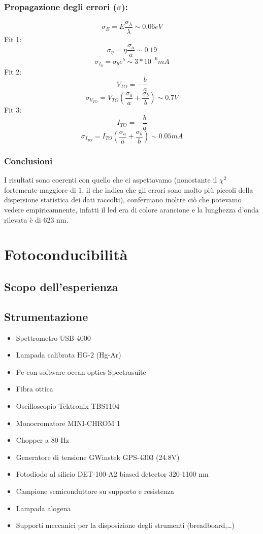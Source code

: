 \documentclass{article}
\begin{document}
\subsubsection{Propagazione degli errori ($\sigma$): }

$$\sigma_E=E\frac{\sigma_{\lambda}}{\lambda} \sim 0.06 eV$$
Fit 1:
$$\sigma_{\eta}=\eta\frac{\sigma_a}{a}\sim 0.19$$
$$\sigma_{I_0}=\sigma_be^b \sim 3*10^{-6} mA$$
Fit 2:
$$V_{TO}=-\frac{b}{a}$$
$$\sigma_{V_{TO}}=V_{TO}\left(\frac{\sigma_a}{a}+\frac{\sigma_b}{b}\right)\sim0.7V$$
Fit  3:
$$I_{TO}=-\frac{b}{a}$$
$$\sigma_{I_{TO}} = I_{TO}\left(\frac{\sigma_a}{a}+\frac{\sigma_b}{b}\right)\sim0.05 mA$$


\subsubsection{Conclusioni}
I risultati sono coerenti con quello che ci aspettavamo (nonostante il $\chi^2$ fortemente maggiore di 1, il che indica che gli errori sono molto più piccoli della dispersione statistica dei dati raccolti), confermano inoltre ciò che potevamo vedere empiricamnente, infatti il led era di colore arancione e la lunghezza d'onda rilevata è di 623 nm.

\newpage
\section{Fotoconducibilità}

\subsection{Scopo dell'esperienza}

\subsection{Strumentazione}
\begin{itemize}
    \item Spettrometro USB 4000
    \item Lampada calibrata  HG-2 (Hg-Ar)
    \item Pc con software ocean optics Spectrasuite
    \item Fibra ottica
    \item Oscilloscopio Tektronix  TBS1104
    \item Monocromatore MINI-CHROM 1
    \item Chopper a 80 Hz
    \item Generatore di tensione GWinstek GPS-4303 (24.8V)
    \item Fotodiodo al silicio DET-100-A2 biased detector 320-1100 nm
    \item Campione semiconduttore su supporto e resistenza
    \item Lampada alogena 
    \item Supporti meccanici per la disposizione degli strumenti (breadboard,…)
\end{itemize}
\end{document}
